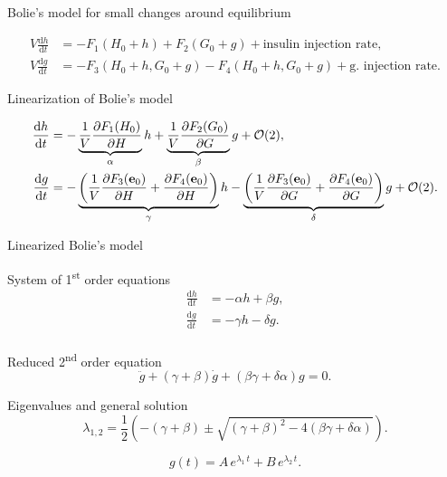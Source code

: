 \documentclass{beamer}
\providecommand{\m}[1]{\ensuremath{\mathrm{#1}}}
\providecommand{\p}[1]{\ensuremath{\partial #1}}
\begin{document}
\begin{frame}{Bolie's model for small changes around equilibrium}

\begin{equation*}
\begin{aligned}
V\frac{\m{d}h}{\m{d}t}&=-F_1(H_0+h)+F_2(G_0+g)+ \text{insulin injection rate},\\
V\frac{\m{d}g}{\m{d}t}&=-F_3(H_0+h,G_0+g)-F_4(H_0+h,G_0+g)+ \text{g. injection rate}.
\end{aligned}
\end{equation*}
\end{frame}

\begin{frame}{Linearization of Bolie's model}


\begin{align*}
\frac{\m{d}h}{\m{d}t}&=-\underbrace{%
		\frac{1}{V}\frac{\p F_1(H_0)}{\p H}}_{\alpha}h+%
%
\underbrace{%
		\frac{1}{V}\frac{\p F_2(G_0)}{\p G}}_{\beta}g+\mathcal{O}(2), \\%
%
\frac{\m{d}g}{\m{d}t}&=%
%
-\underbrace{%
\left(\frac{1}{V}\frac{\p F_3(\mathbf{e}_0)}{\p H}+\frac{\p F_4(\mathbf{e}_0)}{\p H}\right)}_{\gamma}h%
-\underbrace{%
\left(\frac{1}{V}\frac{\p F_3(\mathbf{e}_0)}{\p G}+\frac{\p F_4(\mathbf{e}_0)}{\p G}\right)}_{\delta} g+\mathcal{O}(2).
\end{align*}


\end{frame}

\begin{frame}{Linearized Bolie's model}

System of 1\textsuperscript{st} order equations
\begin{equation*}
\begin{aligned}
\frac{\m{d}h}{\m{d}t}&=-\alpha h + \beta g,\\
\frac{\m{d}g}{\m{d}t}&=-\gamma h - \delta g.\\
\end{aligned}
\end{equation*}

Reduced 2\textsuperscript{nd} order equation
\begin{equation*}
	\ddot g+(\gamma+\beta)\dot g+(\beta \gamma+\delta \alpha)g=0.
\end{equation*}

Eigenvalues and general solution
\begin{equation*}
	\lambda_{1,2}=\frac{1}{2}\left(-(\gamma+\beta)\pm \sqrt{(\gamma+\beta)^2-4(\beta\gamma+\delta\alpha)}\right).
\end{equation*}

\begin{equation*}
	g(t) = A\,e^{\lambda_1 \, t} + B\,e^{\lambda_2 \, t}.
\end{equation*}

\end{frame}
\end{document}

